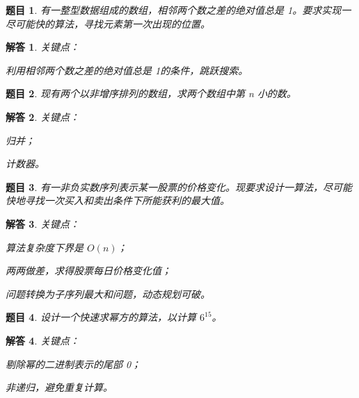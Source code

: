 \documentclass[UTF8, final]{ctexart}
\newtheorem{question}{题目}
\newtheorem{solution}{解答}
\begin{document}
\begin{question}
有一整型数据组成的数组，相邻两个数之差的绝对值总是 1。要求实现一尽可能快的算法，寻找元素第一次出现的位置。
\end{question}
\begin{solution}
关键点：
\begin{compactitem}
    \item 利用\emph{相邻两个数之差的绝对值总是 1}的条件，跳跃搜索。
\end{compactitem}

\end{solution}

\begin{question}
现有两个以非增序排列的数组，求两个数组中第 n 小的数。
\end{question}
\begin{solution}
关键点：
\begin{compactitem}
    \item 归并；
    \item 计数器。
\end{compactitem}

\end{solution}

\begin{question}
\label{q:stocks}
有一非负实数序列表示某一股票的价格变化。现要求设计一算法，尽可能快地寻找一次买入和卖出条件下所能获利的最大值。
\end{question}
\begin{solution}
关键点：
\begin{compactitem}
    \item 算法复杂度下界是 $O(n)$；
    \item 两两做差，求得股票每日价格变化值；
    \item 问题转换为子序列最大和问题，动态规划可破。
\end{compactitem}

\end{solution}

\begin{question}
设计一个快速求幂方的算法，以计算 $6^{15}$。
\end{question}
\begin{solution}
关键点：
\begin{compactitem}
    \item 剔除幂的二进制表示的尾部 0；
    \item 非递归，避免重复计算。
\end{compactitem}

\end{solution}
\end{document}
